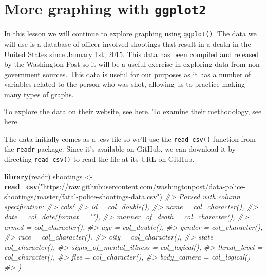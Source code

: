\documentclass[
  12pt,
]{book}
\newenvironment{Shaded}{\begin{snugshade}}{\end{snugshade}}
\newcommand{\CommentTok}[1]{\textcolor[rgb]{0.56,0.35,0.01}{\textit{#1}}}
\newcommand{\KeywordTok}[1]{\textcolor[rgb]{0.13,0.29,0.53}{\textbf{#1}}}
\newcommand{\NormalTok}[1]{#1}
\newcommand{\StringTok}[1]{\textcolor[rgb]{0.31,0.60,0.02}{#1}}
\begin{document}
\hypertarget{ois_graphs}{%
\chapter{\texorpdfstring{More graphing with \texttt{ggplot2}}{More graphing with ggplot2}}\label{ois_graphs}}

In this lesson we will continue to explore graphing using \texttt{ggplot()}. The data we will use is a database of officer-involved shootings that result in a death in the United States since January 1st, 2015. This data has been compiled and released by the Washington Post so it will be a useful exercise in exploring data from non-government sources. This data is useful for our purposes as it has a number of variables related to the person who was shot, allowing us to practice making many types of graphs.

To explore the data on their website, see \href{https://www.washingtonpost.com/graphics/2019/national/police-shootings-2019/?utm_term=.e870afc9a00c}{here}.
To examine their methodology, see \href{https://www.washingtonpost.com/national/how-the-washington-post-is-examining-police-shootings-in-the-united-states/2016/07/07/d9c52238-43ad-11e6-8856-f26de2537a9d_story.html?utm_term=.f07e9800092b}{here}.

The data initially comes as a .csv file so we'll use the \texttt{read\_csv()} function from the \texttt{readr} package. Since it's available on GitHub, we can download it by directing \texttt{read\_csv()} to read the file at its URL on GitHub.

\begin{Shaded}
\begin{Highlighting}[]
\KeywordTok{library}\NormalTok{(readr)}
\NormalTok{shootings <{-}}\StringTok{ }\KeywordTok{read\_csv}\NormalTok{(}\StringTok{"https://raw.githubusercontent.com/washingtonpost/data{-}police{-}shootings/master/fatal{-}police{-}shootings{-}data.csv"}\NormalTok{)}
\CommentTok{\#> Parsed with column specification:}
\CommentTok{\#> cols(}
\CommentTok{\#>   id = col\_double(),}
\CommentTok{\#>   name = col\_character(),}
\CommentTok{\#>   date = col\_date(format = ""),}
\CommentTok{\#>   manner\_of\_death = col\_character(),}
\CommentTok{\#>   armed = col\_character(),}
\CommentTok{\#>   age = col\_double(),}
\CommentTok{\#>   gender = col\_character(),}
\CommentTok{\#>   race = col\_character(),}
\CommentTok{\#>   city = col\_character(),}
\CommentTok{\#>   state = col\_character(),}
\CommentTok{\#>   signs\_of\_mental\_illness = col\_logical(),}
\CommentTok{\#>   threat\_level = col\_character(),}
\CommentTok{\#>   flee = col\_character(),}
\CommentTok{\#>   body\_camera = col\_logical()}
\CommentTok{\#> )}
\end{Highlighting}
\end{Shaded}
\end{document}
